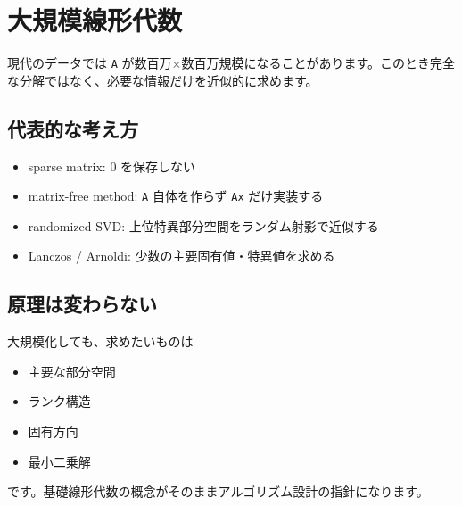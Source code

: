\documentclass[
  11pt,
  a4paper,
]{ltjsarticle}
\author{}
\date{}
\providecommand{\tightlist}{%
  \setlength{\itemsep}{0pt}\setlength{\parskip}{0pt}}
\begin{document}
\hypertarget{ux5927ux898fux6a21ux7ddaux5f62ux4ee3ux6570}{%
\section{大規模線形代数}\label{ux5927ux898fux6a21ux7ddaux5f62ux4ee3ux6570}}

現代のデータでは \texttt{A}
が数百万×数百万規模になることがあります。このとき完全な分解ではなく、必要な情報だけを近似的に求めます。

\hypertarget{ux4ee3ux8868ux7684ux306aux8003ux3048ux65b9}{%
\subsection{代表的な考え方}\label{ux4ee3ux8868ux7684ux306aux8003ux3048ux65b9}}

\begin{itemize}
\tightlist
\item
  sparse matrix: 0 を保存しない
\item
  matrix-free method: \texttt{A} 自体を作らず \texttt{Ax} だけ実装する
\item
  randomized SVD: 上位特異部分空間をランダム射影で近似する
\item
  Lanczos / Arnoldi: 少数の主要固有値・特異値を求める
\end{itemize}

\hypertarget{ux539fux7406ux306fux5909ux308fux3089ux306aux3044}{%
\subsection{原理は変わらない}\label{ux539fux7406ux306fux5909ux308fux3089ux306aux3044}}

大規模化しても、求めたいものは

\begin{itemize}
\tightlist
\item
  主要な部分空間
\item
  ランク構造
\item
  固有方向
\item
  最小二乗解
\end{itemize}

です。基礎線形代数の概念がそのままアルゴリズム設計の指針になります。
\end{document}
